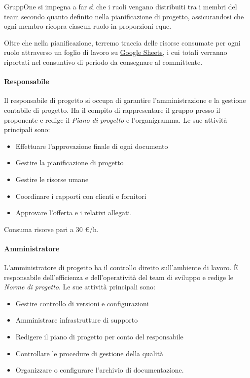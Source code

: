 \documentclass[../norme-di-progetto.tex]{subfiles}
\begin{document}
GruppOne si impegna a far sì che i ruoli vengano distribuiti tra i membri del team secondo quanto definito nella pianificazione di progetto, assicurandosi che ogni membro ricopra ciascun ruolo in proporzioni eque.

Oltre che nella pianificazione, terremo traccia delle risorse consumate per ogni ruolo attraverso un foglio di lavoro su \href{https://www.google.it/intl/it/sheets/about/}{Google Sheets}, i cui totali verranno riportati nel consuntivo di periodo da consegnare al committente.

\paragraph{Responsabile}%
\label{par:responsabile}
Il responsabile di progetto si occupa di garantire l'amministrazione e la gestione contabile di progetto.
Ha il compito di rappresentare il gruppo presso il proponente e redige il \textit{Piano di progetto} e l'organigramma.
Le sue attività principali sono:

\begin{itemize}
  \item Effettuare l'approvazione finale di ogni documento
  \item Gestire la pianificazione di progetto
  \item Gestire le risorse umane
  \item Coordinare i rapporti con clienti e fornitori
  \item Approvare l'offerta e i relativi allegati.
\end{itemize}

Consuma risorse pari a 30 €/h.

\paragraph{Amministratore}%
\label{par:amministratore}
L'amministratore di progetto ha il controllo diretto sull'ambiente di lavoro. È responsabile dell'efficienza e dell'operatività del team di sviluppo e redige le \textit{Norme di progetto}. Le sue attività principali sono:

\begin{itemize}
  \item Gestire controllo di versioni e configurazioni
  \item Amministrare infrastrutture di supporto
  \item Redigere il piano di progetto per conto del responsabile
  \item Controllare le procedure di gestione della qualità
  \item Organizzare o configurare l'archivio di documentazione.
\end{itemize}
\end{document}
